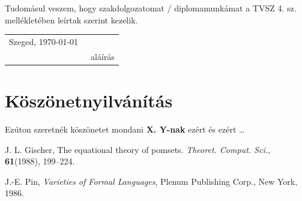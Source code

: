 Tudomásul veszem, hogy szakdolgozatomat / diplomamunkámat a TVSZ 4. sz. mellékletében leírtak szerint kezelik.

\vspace*{2cm}

\begin{tabular}{lc}
	Szeged, \today\
	\hspace{2cm} & \makebox[6cm]{\dotfill} \\
	             & aláírás                 \\
\end{tabular}





\chapter*{Köszönetnyilvánítás}

Ezúton szeretnék köszönetet mondani \textbf{X. Y-nak} ezért és ezért \ldots


%
%


\begin{thebibliography}{9}





	\bibitem{Gischer}
	J. L. Gischer,
	The equational theory of pomsets.
	\emph{Theoret. Comput. Sci.}, \textbf{61}(1988), 199--224.

	\bibitem{Pin}
	J.-E. Pin,
	\emph{Varieties of Formal Languages},
	Plenum Publishing Corp., New York, 1986.





\end{thebibliography}




